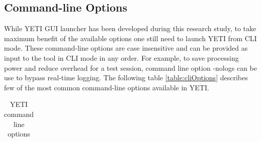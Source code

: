 \subsection{Command-line Options}
While YETI GUI launcher has been developed during this research study, to take maximum benefit of the available options one still need to launch YETI from CLI mode. These command-line options are case insensitive and can be provided as input to the tool in CLI mode in any order. For example, to save processing power and reduce overhead for a test session, command line option -nologs can be use to bypass real-time logging. The following table \ref{table:cliOptions} describes few of the most common command-line options available in YETI. 

\begin{table}[h]
\caption{YETI command line options} %
\smallskip
\centering %
\begin{tabular}{|l|l|} %
\hline


\end{tabular}
\end{table}
